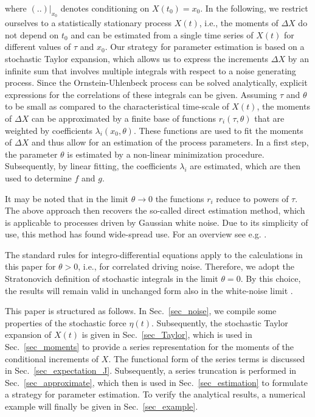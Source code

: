 \documentclass[aps,twocolumn,superscriptaddress,showpacs,showkeys]{revtex4}
\begin{document}
\noindent where $(..)|_{x_0}$ denotes conditioning on $X(t_0)=x_0$.
In the following, we restrict ourselves to a statistically stationary process $X(t)$, i.e., the moments of
$\Delta X$ do not depend on $t_0$ and can be estimated from a single time series of $X(t)$ for different values
of $\tau$ and $x_0$.
Our strategy for parameter estimation is based on a stochastic Taylor expansion, which allows us to express the increments
$\Delta X$ by an infinite sum that involves multiple integrals with respect to a noise generating process.
Since the Ornstein-Uhlenbeck process can be solved analytically, explicit expressions for the correlations of these integrals
can be given.
Assuming $\tau$ and $\theta$ to be small as compared to the characteristical time-scale of $X(t)$, the moments of $\Delta X$
can be approximated by a finite base of functions $r_i(\tau,\theta)$ that are weighted by coefficients
$\lambda_i(x_0,\theta)$.
These functions are used to fit the moments of $\Delta X$ and thus allow for an estimation of the process parameters.
In a first step, the parameter $\theta$ is estimated by a non-linear minimization procedure. Subsequently, by
linear fitting, the coefficients $\lambda_i$ are estimated, which are then used to determine $f$ and $g$.

It may be noted that in the limit $\theta\to 0$ the functions $r_i$ reduce to powers of $\tau$. The above approach
then recovers the so-called direct estimation method, which is applicable to processes driven by Gaussian white
noise. Due to its simplicity of use, this method has found wide-spread use. For an overview see e.g. \cite{friedrich11}.

The standard rules for integro-differential equations apply to the calculations in this paper for $\theta>0$, i.e., for
correlated driving noise.
Therefore, we adopt the Stratonovich definition of stochastic integrals in the limit $\theta=0$.
By this choice, the results will remain valid in unchanged form also in the white-noise limit \cite{vankampen81}.

This paper is structured as follows. In Sec.~\ref{sec_noise}, we compile some properties of the stochastic force
$\eta(t)$. Subsequently, the stochastic Taylor expansion of $X(t)$ is given in Sec.~\ref{sec_Taylor},
which is used in Sec.~\ref{sec_moments} to provide a series representation for the moments of the conditional
increments of $X$. The functional form of the series terms is discussed in Sec.~\ref{sec_expectation_J}. Subsequently,
a series truncation is performed in Sec.~\ref{sec_approximate}, which then is used in Sec.~\ref{sec_estimation}
to formulate a strategy for parameter estimation. To verify the analytical
results, a numerical example will finally be given in Sec.~\ref{sec_example}.
\end{document}
